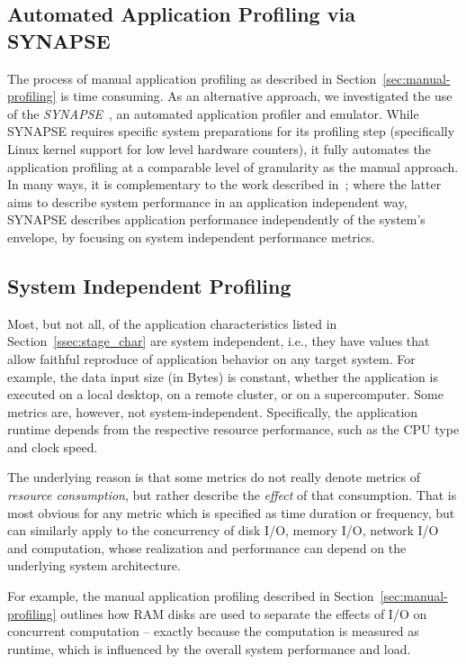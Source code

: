 \documentclass[preprint,12pt]{elsarticle}
\newcommand{\I}[1]{\textit{#1}\xspace}
\begin{document}
\subsection{Automated Application Profiling via SYNAPSE}

The process of manual application profiling as described in
Section~\ref{sec:manual-profiling} is time consuming.  As an alternative
approach, we investigated the use of the
\I{SYNAPSE}~\cite{synapse-software}, an automated application profiler and
emulator.  While SYNAPSE requires specific system preparations
for its profiling step (specifically Linux kernel support for low
level hardware counters), it fully automates the application profiling
at a comparable level of granularity as the manual approach.  In many
ways, it is complementary to the work described
in~\cite{ENVELOPE}; where the latter aims to describe system
performance in an application independent way, SYNAPSE describes
application performance independently of the system's envelope, by
focusing on system independent performance metrics.


\subsection{System Independent Profiling}
\label{ssec:si_profiling}

Most, but not all, of the application characteristics listed in
Section~\ref{ssec:stage_char} are system independent, i.e., they have values
that allow faithful reproduce of application behavior on any
target system.  For example, the data input size (in Bytes) is constant,
whether the application is executed on a local desktop, on
a remote cluster, or on a supercomputer.  Some metrics are, however,
not system-independent.  Specifically, the application runtime depends
from the respective resource performance, such as the CPU type and
clock speed.  

The underlying reason is that some metrics do not really denote
metrics of \I{resource consumption}, but rather describe the
\I{effect} of that consumption.  That is most obvious for any metric
which is specified as time duration or frequency, but can similarly
apply to the concurrency of disk I/O, memory I/O, network I/O and
computation, whose realization and performance can depend on the
underlying system architecture.

For example, the manual application profiling described in
Section~\ref{sec:manual-profiling} outlines how RAM disks are used to
separate the effects of I/O on concurrent computation -- exactly
because the computation is measured as runtime, which is influenced by
the overall system performance and load.
\end{document}
